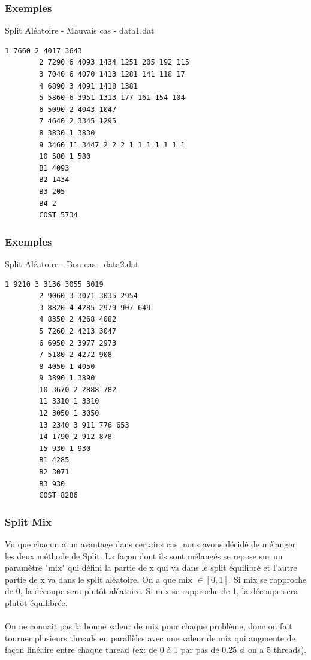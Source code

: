 \documentclass{beamer}
\begin{document}
\begin{frame}[fragile]
    \frametitle{Exemples}
    \begin{exampleblock}{Split Aléatoire - Mauvais cas - data1.dat}
        \begin{lstlisting}[basicstyle=\small]
        1 7660 2 4017 3643 
        2 7290 6 4093 1434 1251 205 192 115 
        3 7040 6 4070 1413 1281 141 118 17 
        4 6890 3 4091 1418 1381 
        5 5860 6 3951 1313 177 161 154 104 
        6 5090 2 4043 1047 
        7 4640 2 3345 1295 
        8 3830 1 3830 
        9 3460 11 3447 2 2 2 1 1 1 1 1 1 1 
        10 580 1 580 
        B1 4093
        B2 1434
        B3 205
        B4 2
        COST 5734
        \end{lstlisting}
    \end{exampleblock}
\end{frame}

\begin{frame}[fragile]
    \frametitle{Exemples}
    \begin{exampleblock}{Split Aléatoire - Bon cas - data2.dat}
        \begin{lstlisting}[basicstyle=\tiny]
        1 9210 3 3136 3055 3019 
        2 9060 3 3071 3035 2954 
        3 8820 4 4285 2979 907 649 
        4 8350 2 4268 4082 
        5 7260 2 4213 3047 
        6 6950 2 3977 2973 
        7 5180 2 4272 908 
        8 4050 1 4050 
        9 3890 1 3890 
        10 3670 2 2888 782 
        11 3310 1 3310 
        12 3050 1 3050 
        13 2340 3 911 776 653 
        14 1790 2 912 878 
        15 930 1 930 
        B1 4285
        B2 3071
        B3 930
        COST 8286
        \end{lstlisting}
    \end{exampleblock}
\end{frame}

\begin{frame}
    \frametitle{Split Mix}
    Vu que chacun a un avantage dans certains cas, nous avons décidé de mélanger les deux méthode de Split. La façon dont ils sont mélangés se repose sur un paramètre "mix" qui défini la partie de x qui va dans le split équilibré et l'autre partie de x va dans le split aléatoire.
    On a que mix $\in [0,1]$. Si mix se rapproche de 0, la découpe sera plutôt aléatoire. Si mix se rapproche de 1, la découpe sera plutôt équilibrée. \\~\\

    On ne connait pas la bonne valeur de mix pour chaque problème, donc on fait tourner plusieurs threads en parallèles avec une valeur de mix qui augmente de façon linéaire entre chaque thread (ex: de 0 à 1 par pas de 0.25 si on a 5 threads).
\end{frame}
\end{document}
